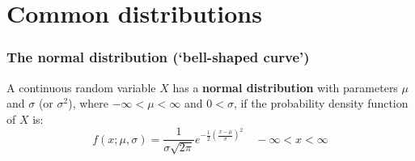 \documentclass[9pt]{beamer}
\begin{document}
\section{Common distributions}

\begin{frame}
\frametitle{The normal distribution (`bell-shaped curve')}

\begin{definition}
A continuous random variable $X$ has a \textbf{normal distribution} with parameters $\mu$ and $\sigma$ (or $\sigma^2$), where $-\infty < \mu < \infty$ and $0 < \sigma$, if the probability density function of $X$ is:
\begin{equation*}
f(x; \mu, \sigma) = \frac{1}{\sigma\sqrt{2 \pi}} e^{-\frac{1}{2}(\frac{x-\mu}{\sigma})^2} \quad -\infty < x < \infty
\end{equation*}
\end{definition}




\end{frame}
\end{document}
